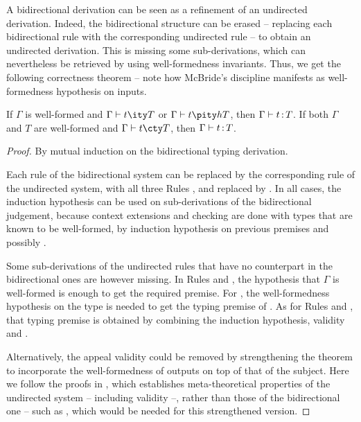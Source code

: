A bidirectional derivation can be seen as a refinement of an undirected derivation.
Indeed, the bidirectional structure can be erased
– replacing each bidirectional rule with the corresponding undirected rule – to obtain an undirected derivation. This is missing some sub-derivations,
which can nevertheless be retrieved by using well-formedness invariants.
Thus, we get the following correctness theorem – note how McBride’s discipline manifests as well-formedness hypothesis on inputs.

\begin{theorem}
  \label{thm:corr-ccomega}
  If $\Gamma$ is well-formed and $\inferty{\Gamma}{t}{T}$ or $\pinferty{h}{\Gamma}{t}{T}$,
  then $\Gamma \vdash t \operatorname{\mathrel{:}} T$.
  If both $\Gamma$ and $T$ are well-formed and
  $\checkty{\Gamma}{t}{T}$, then $\Gamma \vdash t \operatorname{\mathrel{:}} T$. 
\end{theorem}
  
\begin{proof}
  By mutual induction on the bidirectional typing derivation.

  Each rule of the bidirectional system can be replaced by the corresponding rule of the
  undirected system, with all three Rules ,  and  replaced by
  . In all cases, the induction hypothesis can be used on sub-derivations of the bidirectional judgement, because context extensions and checking are
  done with types that are known to be well-formed,
  by induction hypothesis on previous premises and possibly .%

  Some sub-derivations of the undirected rules that have no counterpart
  in the bidirectional ones are however missing.
  In Rules  and ,
  the hypothesis that $\Gamma$ is well-formed is enough to get the required premise.
  For ,
  the well-formedness hypothesis on the type is needed to get the typing premise of
  .
  As for Rules  and ,
  that typing premise is obtained by combining the induction hypothesis,
  validity and .

  Alternatively, the appeal validity could be removed by
  strengthening the theorem to incorporate the well-formedness of outputs on top of that of
  the subject. Here we follow the proofs in , which establishes
  meta-theoretical properties of the undirected system – including validity –,
  rather than those of the bidirectional one – such as ,
  which would be needed for this strengthened version.

\end{proof}

